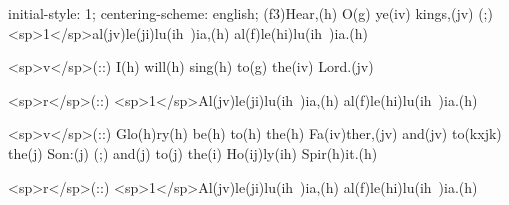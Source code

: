 initial-style: 1;
centering-scheme: english;
(f3)Hear,(h) O(g) ye(iv) kings,(jv) (;) <sp>1</sp>al(jv)le(ji)lu(ih~)ia,(h) al(f)le(hi)lu(ih~)ia.(h) 

<sp>v</sp>(::) I(h) will(h) sing(h) to(g) the(iv) Lord.(jv)

<sp>r</sp>(::) <sp>1</sp>Al(jv)le(ji)lu(ih~)ia,(h) al(f)le(hi)lu(ih~)ia.(h) 

<sp>v</sp>(::) Glo(h)ry(h) be(h) to(h) the(h) Fa(iv)ther,(jv) and(jv) to(kxjk) the(j) Son:(j) (;) and(j) to(j) the(i) Ho(ij)ly(ih) Spir(h)it.(h)

<sp>r</sp>(::) <sp>1</sp>Al(jv)le(ji)lu(ih~)ia,(h) al(f)le(hi)lu(ih~)ia.(h) 